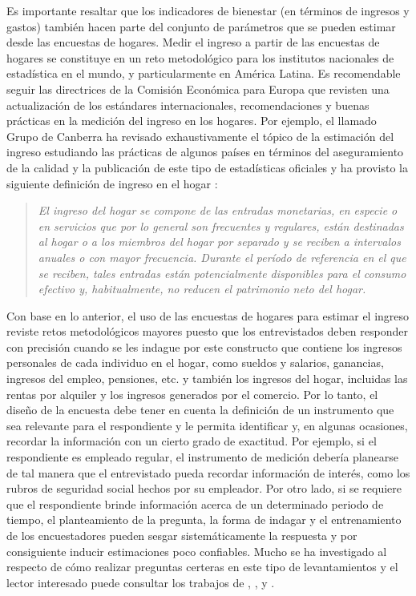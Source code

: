 \documentclass[12pt,spanish,]{book}
\begin{document}
Es importante resaltar que los indicadores de bienestar (en términos de ingresos y gastos) también hacen parte del conjunto de parámetros que se pueden estimar desde las encuestas de hogares. Medir el ingreso a partir de las encuestas de hogares se constituye en un reto metodológico para los institutos nacionales de estadística en el mundo, y particularmente en América Latina. Es recomendable seguir las directrices de la Comisión Económica para Europa que revisten una actualización de los estándares internacionales, recomendaciones y buenas prácticas en la medición del ingreso en los hogares. Por ejemplo, el llamado Grupo de Canberra ha revisado exhaustivamente el tópico de la estimación del ingreso estudiando las prácticas de algunos países en términos del aseguramiento de la calidad y la publicación de este tipo de estadísticas oficiales y ha provisto la siguiente definición de ingreso en el hogar \autocite{United-Nations_2011}:

\begin{quote}
\emph{El ingreso del hogar se compone de las entradas monetarias, en especie o en servicios que por lo general son frecuentes y regulares, están destinadas al hogar o a los miembros del hogar por separado y se reciben a intervalos anuales o con mayor frecuencia. Durante el período de referencia en el que se reciben, tales entradas están potencialmente disponibles para el consumo efectivo y, habitualmente, no reducen el patrimonio neto del hogar.}
\end{quote}

Con base en lo anterior, el uso de las encuestas de hogares para estimar el ingreso reviste retos metodológicos mayores puesto que los entrevistados deben responder con precisión cuando se les indague por este constructo que contiene los ingresos personales de cada individuo en el hogar, como sueldos y salarios, ganancias, ingresos del empleo, pensiones, etc. y también los ingresos del hogar, incluidas las rentas por alquiler y los ingresos generados por el comercio. Por lo tanto, el diseño de la encuesta debe tener en cuenta la definición de un instrumento que sea relevante para el respondiente y le permita identificar y, en algunas ocasiones, recordar la información con un cierto grado de exactitud. Por ejemplo, si el respondiente es empleado regular, el instrumento de medición debería planearse de tal manera que el entrevistado pueda recordar información de interés, como los rubros de seguridad social hechos por su empleador. Por otro lado, si se requiere que el respondiente brinde información acerca de un determinado periodo de tiempo, el planteamiento de la pregunta, la forma de indagar y el entrenamiento de los encuestadores pueden sesgar sistemáticamente la respuesta y por consiguiente inducir estimaciones poco confiables. Mucho se ha investigado al respecto de cómo realizar preguntas certeras en este tipo de levantamientos y el lector interesado puede consultar los trabajos de \textcite{Biemer_Lyberg_2003}, \textcite{Presser_Rothgeb_Couper_Lessler_Martin_Martin_Singer_2004}, y \textcite{Groves_Fowler_Couper_Lepkowski_Singer_Tourangeau_2009}.
\end{document}
